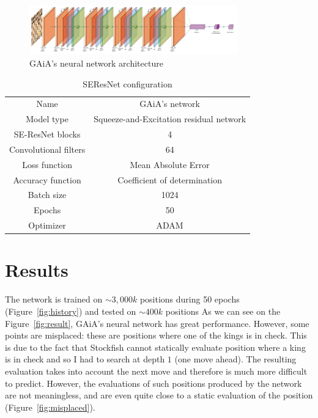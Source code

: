 \documentclass[unnumsec,webpdf,contemporary,large]{Article}%
\theoremstyle{thmstyleone}%
\theoremstyle{thmstyletwo}%
\theoremstyle{thmstylethree}%
\begin{document}
\begin{figure}[H]
  \centering
  \includegraphics[width=9cm]{network/network.pdf}
  \caption{GAiA's neural network architecture}
  \label{fig:model_archi}
\end{figure}

\begin{table}[H]
  \centering
  \begin{tabular}{c c}
    \hline
    Name & GAiA's network\\
    Model type & Squeeze-and-Excitation residual network\\
    \hline
    SE-ResNet blocks & 4\\
    Convolutional filters & 64\\
    Loss function & Mean Absolute Error\\
    Accuracy function & Coefficient of determination\\
    Batch size & 1024\\
    Epochs & 50\\
    Optimizer & ADAM\\
    \hline
  \end{tabular}
  \caption{SEResNet configuration}
  \label{table:config}
\end{table}

\section{Results}

The network is trained on $\sim 3,000k$ positions during 50 epochs (Figure~\ref{fig:history})
and tested on $\sim 400k$ positions
As we can see on the Figure~\ref{fig:result}, GAiA's neural network
has great performance.
However, some points are misplaced: these are positions where one of the kings is
in check. This is due to the fact that Stockfish cannot statically evaluate
position where a king is in check and so I had to search at depth $1$ (one move ahead).
The resulting evaluation takes into account the next move and therefore
is much more difficult to predict. However, the evaluations of
such positions produced by the network are not meaningless,
and are even quite close to a static evaluation of the position
(Figure~\ref{fig:misplaced}).
\end{document}
